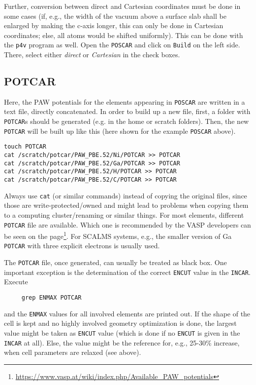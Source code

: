 \documentclass[a4paper,11pt]{article}
\begin{document}
Further, conversion between direct and Cartesian coordinates must be done in some cases (if, e.g., the
width of the vacuum above a surface slab shall be enlarged by making the c-axis longer, 
this can only be done in Cartesian coordinates;
else, all atoms would be shifted uniformly). This can be done with the \texttt{p4v} program as well.
Open the \texttt{POSCAR} and click on \texttt{Build} on the left side. There, select either 
\textit{direct} or \textit{Cartesian} in the check boxes.


\subsection{POTCAR}       
       
Here, the PAW potentials for the elements appearing in \texttt{POSCAR}
 are written in a text file, directly concatenated. 
In order to build up a new file, first, a folder with \texttt{POTCAR}s should be generated (e.g.
in the home or scratch folders). 
Then, the new \texttt{POTCAR} will be built up like this (here shown for the example \texttt{POSCAR}
above).
       \begin{verbatim}
touch POTCAR
cat /scratch/potcar/PAW_PBE.52/Ni/POTCAR >> POTCAR
cat /scratch/potcar/PAW_PBE.52/Ga/POTCAR >> POTCAR
cat /scratch/potcar/PAW_PBE.52/H/POTCAR >> POTCAR
cat /scratch/potcar/PAW_PBE.52/C/POTCAR >> POTCAR
       \end{verbatim}
       Always use \texttt{cat} (or similar commands) instead of copying the original files,
       since those are write-protected/owned and might lead to problems when copying them to a computing 
       cluster/renaming or similar things.
       For most elements, different \texttt{POTCAR} file are available. Which one is 
       recommended by the VASP developers can be seen on the 
       page\footnote{\url{https://www.vasp.at/wiki/index.php/Available_PAW_potentials}}.
   For SCALMS systems, e.g., the smaller version of Ga \texttt{POTCAR} with three explicit 
   electrons is usually used.
   
   The \texttt{POTCAR} file, once generated, can usually be treated as black box. One important exception is 
   the determination of the correct \texttt{ENCUT} value in the \texttt{INCAR}. Execute
   
   \begin{verbatim}
     grep ENMAX POTCAR
   \end{verbatim}

   and the \texttt{ENMAX} values for all involved elements are printed out. If the shape of the 
   cell is kept and no highly involved geometry optimization is done, the largest value 
   might be taken as \texttt{ENCUT} value (which is done if no \texttt{ENCUT} is given in the 
   \texttt{INCAR} at all). Else, the value might be the reference for, e.g., 25-30\% increase, when 
   cell parameters are relaxed (see above).
       
\end{document}
